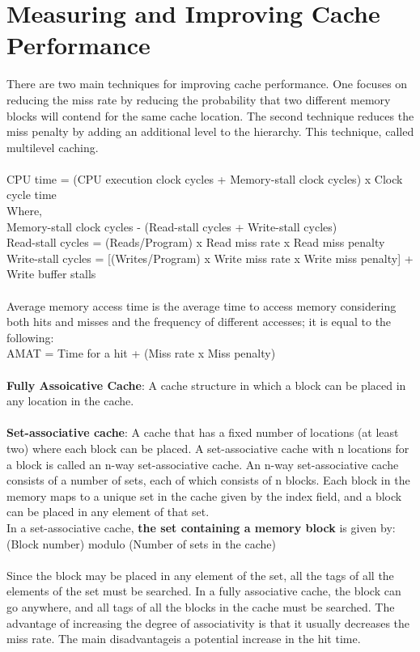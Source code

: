 \documentclass[letterpaper,c12pt]{article}
\begin{document}
\section{Measuring and Improving Cache Performance}
There are two main techniques for improving cache performance. One focuses on reducing the miss rate by reducing the probability that two different memory blocks will contend for the same cache location. The second technique reduces the miss penalty by adding an additional level to the hierarchy. This technique, called multilevel caching.\\\\
CPU time = (CPU execution clock cycles + Memory-stall clock cycles) x Clock cycle time\\
Where,\\
Memory-stall clock cycles - (Read-stall cycles + Write-stall cycles)\\
Read-stall cycles = (Reads/Program) x Read miss rate x Read miss penalty\\
Write-stall cycles = [(Writes/Program) x Write miss rate x Write miss penalty] + Write buffer stalls\\\\
Average memory access time is the average time to access memory considering both hits and misses and the frequency of different accesses; it is equal to the following:\\
AMAT = Time for a hit + (Miss rate x Miss penalty)\\\\
\textbf{Fully Assoicative Cache}: A cache structure in which a block can be placed in any location in the cache.\\\\
\textbf{Set-associative cache}: A cache that has a fixed number of locations (at least two) where each block can be placed. A set-associative cache with n locations for a block is called an n-way set-associative cache. An n-way set-associative cache consists of a number of sets, each of which consists of n blocks. Each block in the memory maps to a unique set in the cache given by the index field, and a block can be placed in any element of that set.\\
In a set-associative cache, \textbf{the set containing a memory block} is given by:\\
 (Block number) modulo (Number of sets in the cache)\\\\
 Since the block may be placed in any element of the set, all the tags of all the elements of the set must be searched. In a fully associative cache, the block can go anywhere, and all tags of all the blocks in the cache must be searched. The advantage of increasing the degree of associativity is that it usually decreases the miss rate. The main disadvantageis a potential increase in the hit time.\\\\
\end{document}
